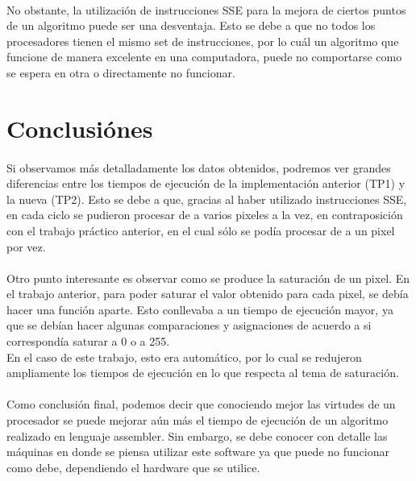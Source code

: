 \documentclass[11pt, a4paper]{article}
\begin{document}
\paragraph{}
No obstante, la utilizaci\'on de instrucciones SSE para la mejora de ciertos puntos de un algoritmo puede ser una desventaja. Esto se debe a que no todos los procesadores tienen el mismo set de instrucciones, por lo cu\'al un algoritmo que funcione de manera excelente en una computadora, puede no comportarse como se espera en otra o directamente no funcionar.


\section{Conclusi\'ones}

\paragraph{}
Si observamos m\'as detalladamente los datos obtenidos, podremos ver grandes diferencias entre los tiempos de ejecuci\'on de la implementaci\'on anterior (TP1) y la nueva (TP2). Esto se debe a que, gracias al haber utilizado instrucciones SSE, en cada ciclo se pudieron procesar de a varios pixeles a la vez, en contraposici\'on con el trabajo pr\'actico anterior, en el cual s\'olo se pod\'ia procesar de a un pixel por vez.

\paragraph{}
Otro punto interesante es observar como se produce la saturaci\'on de un pixel. En el trabajo anterior, para poder saturar el valor obtenido para cada pixel, se deb\'ia hacer una funci\'on aparte. Esto conllevaba a un tiempo de ejecuci\'on mayor, ya que se deb\'ian hacer algunas comparaciones y asignaciones de acuerdo a si correspond\'ia saturar a 0 o a 255.\\
En el caso de este trabajo, esto era autom\'atico, por lo cual se redujeron ampliamente los tiempos de ejecuci\'on en lo que respecta al tema de saturaci\'on. 

\paragraph{}
Como conclusi\'on final, podemos decir que conociendo mejor las virtudes de un procesador se puede mejorar a\'un m\'as el tiempo de ejecuci\'on de un algoritmo realizado en lenguaje assembler. Sin embargo, se debe conocer con detalle las m\'aquinas en donde se piensa utilizar este software ya que puede no funcionar como debe, dependiendo el hardware que se utilice.
\end{document}
